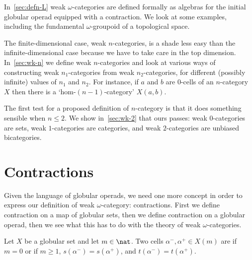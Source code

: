 In~\ref{sec:defn-L} weak $\omega$-categories are defined formally as
algebras for the initial globular operad equipped with a contraction.  We
look at some examples, including the fundamental $\omega$-groupoid
of a topological space.

The finite-dimensional case, weak $n$-categories, is a shade less easy than
the infinite-dimensional case because we have to take care in the top
dimension.  In~\ref{sec:wk-n} we define weak $n$-categories and look at
various ways of constructing weak $n_1$-categories from weak
$n_2$-categories, for different (possibly infinite) values of $n_1$ and
$n_2$.  For instance, if $a$ and $b$ are 0-cells of an $n$-category $X$
then there is a `hom-$(n-1)$-category' $X(a,b)$.

The first test for a proposed definition of $n$-category is that it does
something sensible when $n\leq 2$.  We show in~\ref{sec:wk-2} that ours
passes: weak $0$-categories are sets, weak $1$-categories are categories,
and weak $2$-categories are unbiased bicategories.



\section{Contractions}

Given the language of globular operads, we need one more concept in order
to express our definition of weak $\omega$-category: contractions.  First
we define contraction on a map of globular sets, then we define contraction
on a globular operad, then we see what this has to do with the theory of
weak $\omega$-categories.

\begin{defn}
Let $X$ be a globular set and let $m\in\nat$.  Two cells $\alpha^-,
\alpha^+ \in X(m)$ are %
%
%
if $m=0$ or if $m\geq 1$,
$s(\alpha^-) = s(\alpha^+)$, and $t(\alpha^-) = t(\alpha^+)$.
\end{defn}

